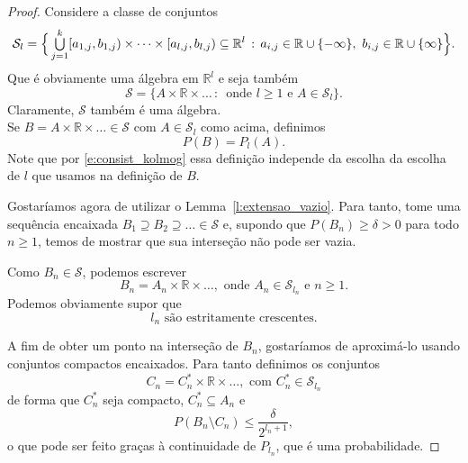 \begin{proof}
  Considere a classe de conjuntos
  \begin{equation*}
    \mathcal{S}_l = \Big\{ \operatorname*{{\textstyle \bigcup}}_{j=1}^k [a_{1,j}, b_{1,j}) \times \dots \times [a_{l,j}, b_{l,j}) \subseteq \mathbb{R}^l \, : \, 
    a_{i,j} \in \mathbb{R} \cup \{-\infty\},\ b_{i,j} \in \mathbb{R} \cup \{\infty\} \Big\}.
  \end{equation*}
  Que é obviamente uma álgebra em $\mathbb{R}^l$ e seja também
  \begin{equation}
    \mathcal{S} = \big\{ A \times \mathbb{R} \times \dots\, : \, \text{ onde } l \geq 1 \text{ e } A \in \mathcal{S}_l \big\}.
  \end{equation}
  Claramente, $\mathcal{S}$ também é uma álgebra.\\
Se $B = A \times \mathbb{R} \times \dots \in \mathcal{S}$ com $A \in \mathcal{S}_l$ como acima, definimos
  \begin{equation}
    P(B) = P_l(A).
  \end{equation}
  Note que por \eqref{e:consist_kolmog} essa definição independe da escolha da escolha de $l$ que usamos na definição de $B$.

  Gostaríamos agora de utilizar o Lemma~\ref{l:extensao_vazio}.
  Para tanto, tome uma sequência encaixada $B_1 \supseteq B_2 \supseteq \dots \in \mathcal{S}$ e, supondo que $P(B_n) \geq \delta > 0$ para todo $n \geq 1$, temos de mostrar que sua interseção não pode ser vazia.

  Como $B_n \in \mathcal{S}$, podemos escrever
  \begin{equation}
    B_n = A_n \times \mathbb{R} \times \dots, \text{ onde $A_n \in \mathcal{S}_{l_n}$ e $n \geq 1$.}
  \end{equation}
  Podemos obviamente supor que
  \begin{equation}
    \label{e:l_n_monotona}
    \text{$l_n$ são estritamente crescentes.}
  \end{equation}

  A fim de obter um ponto na interseção de $B_n$, gostaríamos de aproximá-lo usando conjuntos compactos encaixados.
  Para tanto definimos os conjuntos
  \begin{equation}
    C_n = C_n^* \times \mathbb{R} \times \dots, \text{ com $C_n^* \in \mathcal{S}_{l_n}$}
  \end{equation}
  de forma que $C_n^*$ seja compacto, $C_n^* \subseteq A_n$ e
  \begin{equation}
    P(B_n \setminus C_n) \leq \frac{\delta}{2^{l_n + 1}},
  \end{equation}
  o que pode ser feito graças à continuidade de $P_{l_n}$, que é uma probabilidade.


\end{proof}
